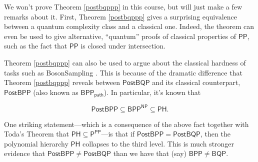 \documentclass[12pt]{report}
\theoremstyle{plain}
\theoremstyle{definition}
\begin{document}
We won't prove Theorem \ref{postbqppp} in this course, but will just make a few remarks about it.  First, Theorem \ref{postbqppp} gives a surprising equivalence between a quantum complexity class and a classical one.  Indeed, the theorem can even be used to give alternative, ``quantum'' proofs of classical properties of $\mathsf{PP}$, such as the fact that $\mathsf{PP}$ is closed under intersection.

Theorem \ref{postbqppp} can also be used to argue about the classical hardness of tasks such as BosonSampling \cite{aark}.  This is because of the dramatic difference that Theorem \ref{postbqppp} reveals between $\mathsf{PostBQP}$ and its classical counterpart, $\mathsf{PostBPP}$ (also known as $\mathsf{BPP_{path}}$).  In particular, it's known that

$$\mathsf{PostBPP} \subseteq \mathsf{BPP^{NP}} \subseteq \mathsf{PH}.$$

One striking statement---which is a consequence of the above fact together with Toda's Theorem \cite{toda} that $\mathsf{PH}\subseteq\mathsf{P^{PP}}$---is that if $\mathsf{PostBPP}=\mathsf{PostBQP}$, then the polynomial hierarchy $\mathsf{PH}$ collapses to the third level.  This is much stronger evidence that $\mathsf{PostBPP}\neq \mathsf{PostBQP}$ than we have that (say) $\mathsf{BPP}\neq \mathsf{BQP}$.
\end{document}
